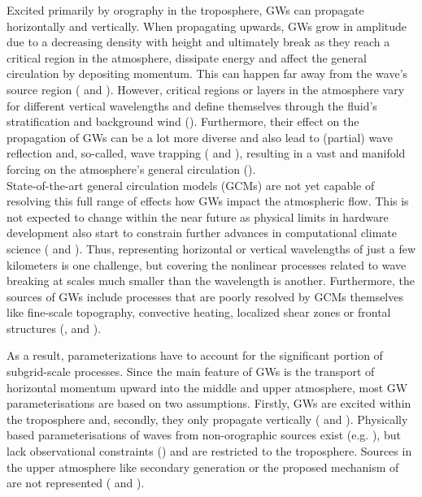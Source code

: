 Excited primarily by orography in the troposphere, GWs can propagate horizontally and vertically. When propagating upwards, GWs grow in amplitude due to a decreasing density with height and ultimately break as they reach a critical region in the atmosphere, dissipate energy and affect the general circulation by depositing momentum. This can happen far away from the wave's source region (\cite{teixeira_physics_2014} and \cite{eliassen_transfer_1960}). However, critical regions or layers in the atmosphere vary for different vertical wavelengths and define themselves through the fluid's stratification and background wind (\cite{teixeira_physics_2014}). Furthermore, their effect on the propagation of GWs can be a lot more diverse and also lead to (partial) wave reflection and, so-called, wave trapping (\cite{fritts_gravity_2018} and \cite{scorer_theory_1949}), resulting in a vast and manifold forcing on the atmosphere's general circulation (\cite{alexander_recent_2010}). \\
State-of-the-art general circulation models (GCMs) are not yet capable of resolving this full range of effects how GWs impact the atmospheric flow. This is not expected to change within the near future as physical limits in hardware development also start to constrain further advances in computational climate science (\cite{balaji_climbing_2021} and \cite{balaji_climate_2015}). Thus, representing horizontal or vertical wavelengths of just a few kilometers is one challenge, but covering the nonlinear processes related to wave breaking at scales much smaller than the wavelength is another. Furthermore, the sources of GWs include processes that are poorly resolved by GCMs themselves like fine-scale topography, convective heating, localized shear zones or frontal structures (\cite{medvedev_gravity_2019}, \cite{fritts_gravity_2003} and \cite{plougonven_internal_2014}). 

As a result, parameterizations have to account for the significant portion of subgrid-scale processes. Since the main feature of GWs is the transport of horizontal momentum upward into the middle and upper atmosphere, most GW parameterisations are based on two assumptions. Firstly, GWs are excited within the troposphere and, secondly, they only propagate vertically (\cite{plougonven_how_2020} and \cite{alexander_recent_2010}). Physically based parameterisations of waves from non-orographic sources exist (e.g. \cite{scinocca_accurate_2003}), but lack observational constraints (\cite{plougonven_internal_2014}) and are restricted to the troposphere. Sources in the upper atmosphere like secondary generation or the proposed mechanism of \textcite{dornbrack_stratospheric_2022} are not represented (\cite{plougonven_how_2020} and \cite{kim_overview_2003}).

